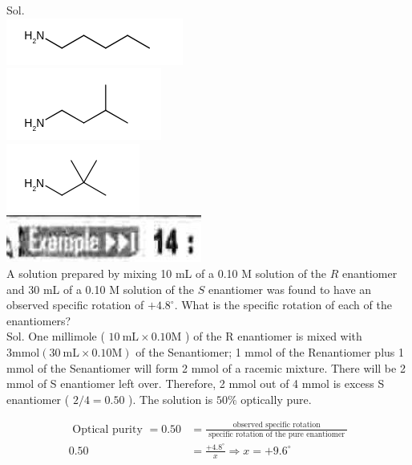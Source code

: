 \documentclass[10pt]{article}
\begin{document}
Sol.\\
\includegraphics{smile-a72375410e288dd15c396fb8d7690a43b59a4bf7}\\
\includegraphics{smile-7248d79aad6b55634fec36726dbe20708af2fdfe}\\
\includegraphics{smile-4ad1530a44b83991db77435d2cc05f4d0ff4485d}\\
\includegraphics[max width=\textwidth, center]{2025_01_28_8470952b98110cec3aabg-063(1)}\\
A solution prepared by mixing 10 mL of a 0.10 M solution of the $R$ enantiomer and 30 mL of a 0.10 M solution of the $S$ enantiomer was found to have an observed specific rotation of $+4.8^{\circ}$. What is the specific rotation of each of the enantiomers?\\
Sol. One millimole ( $10 \mathrm{~mL} \times 0.10 \mathrm{M}$ ) of the R enantiomer is mixed with $3 \mathrm{mmol}(30 \mathrm{~mL} \times 0.10 \mathrm{M})$ of the Senantiomer; 1 mmol of the Renantiomer plus 1 mmol of the Senantiomer will form 2 mmol of a racemic mixture. There will be 2 mmol of S enantiomer left over. Therefore, 2 mmol out of 4 mmol is excess S enantiomer ( $2 / 4=0.50$ ). The solution is $50 \%$ optically pure.

$$
\begin{aligned}
\text { Optical purity }=0.50 & =\frac{\text { observed specific rotation }}{\text { specific rotation of the pure enantiomer }} \\
0.50 & =\frac{+4.8^{\circ}}{x} \Rightarrow x=+9.6^{\circ}
\end{aligned}
$$
\end{document}
